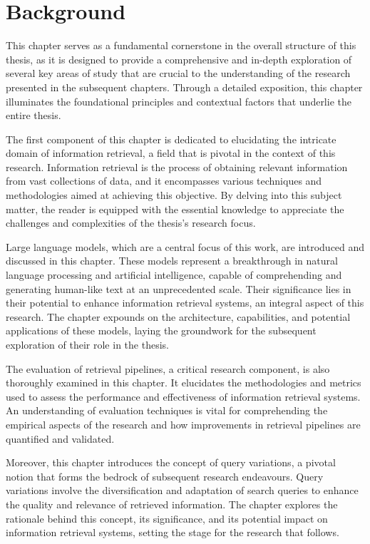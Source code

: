 \chapter{Background}
This chapter serves as a fundamental cornerstone in the overall structure of this thesis, as it is designed to provide a comprehensive and in-depth exploration of several key areas of study that are crucial to the understanding of the research presented in the subsequent chapters. Through a detailed exposition, this chapter illuminates the foundational principles and contextual factors that underlie the entire thesis.

The first component of this chapter is dedicated to elucidating the intricate domain of information retrieval, a field that is pivotal in the context of this research. Information retrieval is the process of obtaining relevant information from vast collections of data, and it encompasses various techniques and methodologies aimed at achieving this objective. By delving into this subject matter, the reader is equipped with the essential knowledge to appreciate the challenges and complexities of the thesis's research focus.

Large language models, which are a central focus of this work, are introduced and discussed in this chapter. These models represent a breakthrough in natural language processing and artificial intelligence, capable of comprehending and generating human-like text at an unprecedented scale. Their significance lies in their potential to enhance information retrieval systems, an integral aspect of this research. The chapter expounds on the architecture, capabilities, and potential applications of these models, laying the groundwork for the subsequent exploration of their role in the thesis.

The evaluation of retrieval pipelines, a critical research component, is also thoroughly examined in this chapter. It elucidates the methodologies and metrics used to assess the performance and effectiveness of information retrieval systems. An understanding of evaluation techniques is vital for comprehending the empirical aspects of the research and how improvements in retrieval pipelines are quantified and validated.

Moreover, this chapter introduces the concept of query variations, a pivotal notion that forms the bedrock of subsequent research endeavours. Query variations involve the diversification and adaptation of search queries to enhance the quality and relevance of retrieved information. The chapter explores the rationale behind this concept, its significance, and its potential impact on information retrieval systems, setting the stage for the research that follows.




